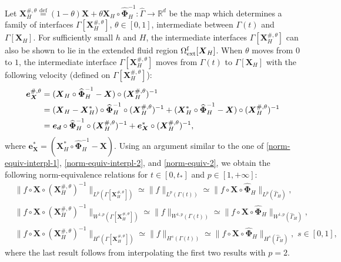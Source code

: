 \documentclass[11pt,reqno]{amsart}
\theoremstyle{definition}
\theoremstyle{plain}
\numberwithin{theorem}{section}
\numberwithin{proposition}{section}
\numberwithin{lemma}{section}
\numberwithin{equation}{section}
\newcommand{\bs}[1]{\boldsymbol{#1}}
\renewcommand{\(}{\bigl(}
\renewcommand{\)}{\bigr)}
\def\eqd{\stackrel{\mathrm{def}}{=}}
\begin{document}
Let ${\bs X}_H^{\#,\theta} \eqd (1-\theta){\bs X} + \theta {\bs X}_H \circ \widehat{\bs\Phi}_H^{-1} : \widehat\Gamma \rightarrow \mathbb{R}^d$ be the map which determines a family of interfaces $\Gamma[{\bs X}_H^{\#,\theta}]$, $\theta\in[0,1]$, intermediate between $\Gamma(t)$ and $\Gamma[{\bs X}_H]$. For sufficiently small $h$ and $H$, the intermediate interfaces $\Gamma[{\bs X}_H^{\#,\theta}]$ can also be shown to lie in the extended fluid region $\Omega^{\rm f}_{\rm ext}[{\bs X}_H]$.  
When $\theta$ moves from $0$ to $1$, the intermediate interface $\Gamma[{\bs X}_H^{\#,\theta}]$ moves from $\Gamma(t)$ to $\Gamma[{\bs X}_H]$ with the following velocity (defined on $\Gamma[{\bs X}_H^{\#,\theta}]$): 
\begin{align}\label{def-ej-theta}
{\bs e}_{\bs X}^{\#,\theta}
&= ({\bs X}_H \circ \widehat{\bs\Phi}_H^{-1} - {\bs X} ) \circ ({\bs X}_H^{\#,\theta})^{-1} \notag\\
&= ({\bs X}_H - {\bs X}_H^*)\circ \widehat{\bs\Phi}_H^{-1} \circ ({\bs X}_H^{\#,\theta})^{-1} + ({\bs X}_H^*\circ \widehat{\bs\Phi}_H^{-1} - {\bs X}) \circ ({\bs X}_H^{\#,\theta})^{-1} \notag\\
&= {\bs e}_{\bs d} \circ \widehat{\bs\Phi}_H^{-1} \circ ({\bs X}_H^{\#,\theta})^{-1} + {\bs e}_{\bs X}^* \circ ({\bs X}_H^{\#,\theta})^{-1} , 
\end{align}
where ${\bs e}_{\bs X}^*=({\bs X}_H^*\circ \widehat{\bs\Phi}_H^{-1} - {\bs X})$. Using an argument similar to the one of \eqref{norm-equiv-interpl-1}, \eqref{norm-equiv-interpl-2}, and \eqref{norm-equiv-2}, we obtain the following norm-equivalence relations for $t \in [0,t_*]$ and $p\in[1,+\infty]$:
\begin{subequations}\label{norm-equiv-X-theta}
\begin{align}
&\| f \circ {\bs X} \circ({\bs X}_H^{\#,\theta})^{-1} \|_{L^p(\Gamma[{\bs X}_H^{\#,\theta}])} \simeq \| f \|_{L^p(\Gamma(t))} \simeq \| f \circ {\bs X}\circ\widehat{\bs\Phi}_H\|_{L^p(\widehat\Gamma_H)} , \\
&\| f \circ {\bs X} \circ({\bs X}_H^{\#,\theta})^{-1} \|_{W^{1,p}(\Gamma[{\bs X}_H^{\#,\theta}])} \simeq \| f \|_{W^{1,p}(\Gamma(t))} 
\simeq \| f \circ {\bs X}\circ\widehat{\bs\Phi}_H\|_{W^{1,p}(\widehat\Gamma_H)} ,\\
&\| f \circ {\bs X} \circ({\bs X}_H^{\#,\theta})^{-1} \|_{H^{s}(\Gamma[{\bs X}_H^{\#,\theta}])} \simeq \| f \|_{H^{s}(\Gamma(t))} 
\simeq \| f \circ {\bs X}\circ\widehat{\bs\Phi}_H\|_{H^{s}(\widehat\Gamma_H)} ,\,\,s\in[0,1],
\end{align}
\end{subequations} 
where the last result follows from interpolating the first two results with $p=2$. 
\end{document}
